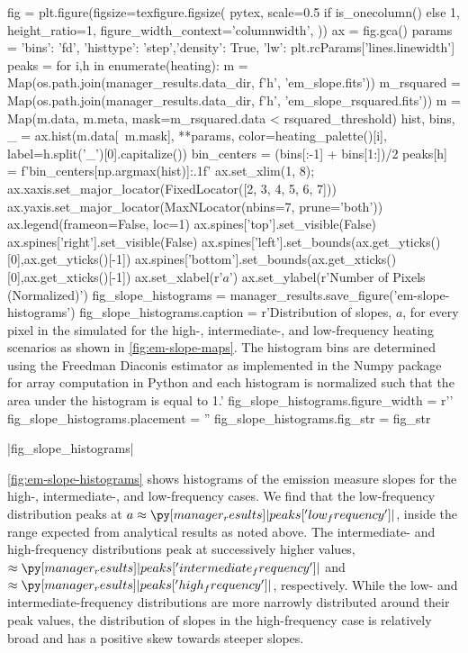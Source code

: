 \begin{pycode}
fig = plt.figure(figsize=texfigure.figsize(
    pytex,
    scale=0.5 if is_onecolumn() else 1,
    height_ratio=1,
    figure_width_context='columnwidth',
))
ax = fig.gca()
params = {'bins': 'fd', 'histtype': 'step','density': True, 
          'lw': plt.rcParams['lines.linewidth']}
peaks = {}
for i,h in enumerate(heating):
    m = Map(os.path.join(manager_results.data_dir, f'{h}', 'em_slope.fits'))
    m_rsquared = Map(os.path.join(manager_results.data_dir, f'{h}', 'em_slope_rsquared.fits'))
    m = Map(m.data, m.meta, mask=m_rsquared.data < rsquared_threshold)
    hist, bins, _ = ax.hist(m.data[~m.mask], **params, color=heating_palette()[i],
                         label=h.split('_')[0].capitalize())
    bin_centers = (bins[:-1] + bins[1:])/2
    peaks[h] = f'{bin_centers[np.argmax(hist)]:.1f}'
ax.set_xlim(1, 8);
ax.xaxis.set_major_locator(FixedLocator([2, 3, 4, 5, 6, 7]))
ax.yaxis.set_major_locator(MaxNLocator(nbins=7, prune='both'))
ax.legend(frameon=False, loc=1)
ax.spines['top'].set_visible(False)
ax.spines['right'].set_visible(False)
ax.spines['left'].set_bounds(ax.get_yticks()[0],ax.get_yticks()[-1])
ax.spines['bottom'].set_bounds(ax.get_xticks()[0],ax.get_xticks()[-1])
ax.set_xlabel(r'$a$')
ax.set_ylabel(r'Number of Pixels (Normalized)')
fig_slope_histograms = manager_results.save_figure('em-slope-histograms')
fig_slope_histograms.caption = r'Distribution of \dem{} slopes, $a$, for every pixel in the simulated \AR{} for the high-, intermediate-, and low-frequency heating scenarios as shown in \autoref{fig:em-slope-maps}. The histogram bins are determined using the Freedman Diaconis estimator \citep{freedman_histogram_1981} as implemented in the Numpy package for array computation in Python \citep{oliphant_guide_2006} and each histogram is normalized such that the area under the histogram is equal to 1.'
fig_slope_histograms.figure_width = r'\columnwidth'
fig_slope_histograms.placement = ''
fig_slope_histograms.fig_str = fig_str
\end{pycode}
|fig_slope_histograms|

\autoref{fig:em-slope-histograms} shows histograms of the emission measure slopes for the high-, intermediate-, and low-frequency cases. We find that the low-frequency distribution peaks at $a\approx\py[manager_results]|peaks['low_frequency']|$, inside the range expected from analytical results as noted above. The intermediate- and high-frequency distributions peak at successively higher values, $\approx\py[manager_results]|peaks['intermediate_frequency']|$ and $\approx\py[manager_results]|peaks['high_frequency']|$, respectively. While the low- and intermediate-frequency distributions are more narrowly distributed around their peak values, the distribution of slopes in the high-frequency case is relatively broad and has a positive skew towards steeper slopes. 

